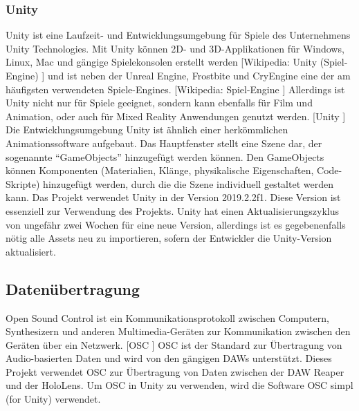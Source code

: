 \documentclass[11pt, titlepage, fleqn]{report}
\begin{document}
                \subsubsection{Unity}
                    Unity ist eine Laufzeit- und Entwicklungsumgebung für Spiele des Unternehmens Unity Technologies. Mit Unity können 2D- und 
                    3D-Applikationen für Windows, Linux, Mac und gängige 
                    Spielekonsolen erstellt werden [Wikipedia: Unity 
                    (Spiel-Engine) \cite{Unity-Engine}] und ist neben der 
                    Unreal Engine, Frostbite und CryEngine eine der am 
                    häufigsten verwendeten Spiele-Engines. [Wikipedia: 
                    Spiel-Engine 
                    \cite{Spiel-Engine}]\newline
                    Allerdings ist Unity nicht nur für Spiele geeignet, sondern 
                    kann ebenfalls für Film und Animation, oder auch für Mixed 
                    Reality Anwendungen genutzt werden. [Unity \cite{Unity}] 
                    \newline
                    Die Entwicklungsumgebung Unity ist ähnlich einer 
                    herkömmlichen Animationssoftware aufgebaut. Das 
                    Hauptfenster stellt eine Szene dar,
                    der sogenannte “GameObjects” hinzugefügt werden können. Den 
                    GameObjects können Komponenten (Materialien, Klänge, 
                    physikalische Eigenschaften, 
                    Code-Skripte) hinzugefügt werden, durch die die Szene 
                    individuell gestaltet werden kann.\newline
                    Das Projekt verwendet Unity in der Version 2019.2.2f1. 
                    Diese Version ist essenziell zur Verwendung des Projekts. 
                    Unity hat einen 
                    Aktualisierungszyklus von ungefähr zwei Wochen für eine neue Version, allerdings ist es gegebenenfalls nötig alle Assets neu 
                    zu importieren, sofern der Entwickler die Unity-Version aktualisiert.
            \subsection{Datenübertragung}
            \label{sec:2.3.3Daten}
                Open Sound Control ist ein Kommunikationsprotokoll zwischen Computern, Synthesizern und anderen Multimedia-Geräten zur Kommunikation 
                zwischen den Geräten über ein Netzwerk. [OSC \cite{OSC}]\newline
                OSC ist der Standard zur Übertragung von Audio-basierten Daten und wird von den gängigen DAWs unterstützt. 
                Dieses Projekt verwendet OSC zur Übertragung von Daten zwischen der DAW Reaper und der HoloLens. Um OSC in Unity zu verwenden, 
                wird die Software OSC simpl (for Unity) verwendet.
\end{document}
